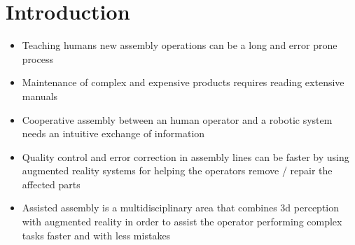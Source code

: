 \section{Introduction}\label{sec:introduction}

\begin{itemize}
	\item Teaching humans new assembly operations can be a long and error prone process
	\item Maintenance of complex and expensive products requires reading extensive manuals
	\item Cooperative assembly between an human operator and a robotic system needs an intuitive exchange of information
	\item Quality control and error correction in assembly lines can be faster by using augmented reality systems for helping the operators remove / repair the affected parts
\end{itemize}

\begin{itemize}
	\item Assisted assembly is a multidisciplinary area that combines 3d perception with augmented reality in order to assist the operator performing complex tasks faster and with less mistakes
\end{itemize}
